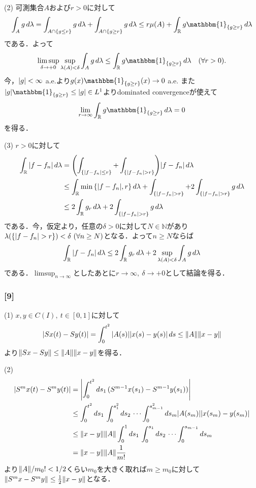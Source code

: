 \documentclass[a4j]{ltjsarticle}
\newcommand{\Rset}{\mathbb{R}}
\newcommand{\Nset}{\mathbb{N}}
\newcommand{\1}{\mathbbm{1}}
\numberwithin{equation}{section}
\theoremstyle{definition}
\begin{document}
(2) 可測集合$A$および$r>0$に対して
\begin{equation}
    \int_{A}g\,d\lambda =\int_{A\cap\qty{g\leq r}}g\,d\lambda+\int_{A\cap\qty{g\geq r}}g\,d\lambda\leq r\mu(A)+\int_{\Rset}g\1_{\qty{g\geq r}}\,d\lambda 
\end{equation}
である．よって
\begin{equation}
    \limsup_{\delta\to+0}\sup_{\lambda(A)<\delta}\int_{A}g\,d\lambda\leq \int_{\Rset}g\1_{\qty{g\geq r}}\,d\lambda\quad (\forall r>0).
\end{equation}
今，$\abs{g}<\infty$ a.e.より$g(x)\1_{\qty{g\geq r}}(x)\to 0$ a.e. また$\abs{g}\1_{\qty{g\geq r}}\leq \abs{g}\in L^1$よりdominated convergenceが使えて
\begin{equation}
    \lim_{r\to\infty}\int_{\Rset}g\1_{\qty{g\geq r}}\,d\lambda=0
\end{equation}
を得る．

(3) $r>0$に対して
\begin{align}
    \int_{\Rset}\abs{f-f_n}\,d\lambda&=\qty(\int_{\qty{\abs{f-f_n}\leq r}}+\int_{\qty{\abs{f-f_n}>r}})\abs{f-f_n}\,d\lambda\\
    &\leq \int_{\Rset}\min\qty{\abs{f-f_n}, r}\,d\lambda+\int_{\qty{\abs{f-f_n}>r}} +2\int_{\qty{\abs{f-f_n}>r}}g\,d\lambda\\
    &\leq 2\int_{\Rset}g_r\,d\lambda+2\int_{\qty{\abs{f-f_n}>r}}g\,d\lambda 
\end{align}
である．今，仮定より，任意の$\delta>0$に対して$N\in\Nset$があり$\lambda\qty(\qty{\abs{f-f_n}>r})<\delta\ (\forall n\geq N)$となる．よって$n\geq N$ならば
\begin{equation}
    \int_{\Rset}\abs{f-f_n}\,d\lambda\leq 2\int_{\Rset}g_r\,d\lambda+2\sup_{\lambda(A)<\delta}\int_{A}g\,d\lambda
\end{equation}
である．$\limsup_{n\to\infty}$としたあとに$r\to\infty,\ \delta\to+0$として結論を得る．

\subsubsection*{[9]}
(1) $x,y\in C(I),\ t\in[0,1]$に対して
\begin{equation}
    \abs{Sx(t)-Sy(t)}=\int_{0}^{t^2}\abs{A(s)}\abs{x(s)-y(s)}\,ds\leq \norm{A}\norm{x-y}
\end{equation}
より$\norm{Sx-Sy}\leq \norm{A}\norm{x-y}$を得る．

(2) 
\begin{align}
    \abs{S^mx(t)-S^my(t)}&=\abs{\int_{0}^{t^2}ds_1\,(S^{m-1}x(s_1)-S^{m-1}y(s_1))}\\
    &\leq \int_{0}^{t^2}ds_1\,\int_{0}^{s_1^2}ds_2\,\cdots\int_{0}^{s_{m-1}^2}ds_m \abs{A(s_m)}\abs{x(s_m)-y(s_m)}\\
    &\leq \norm{x-y}\norm{A}\int_{0}^{1}ds_1\,\int_{0}^{s_1}ds_2\,\cdots\int_{0}^{s_{m-1}}ds_m\\
    &=\norm{x-y}\norm{A}\frac{1}{m!}
\end{align}
より$\norm{A}/m_0!<1/2$くらい$m_0$を大きく取れば$m\geq m_0$に対して$\norm{S^mx-S^my}\leq \frac{1}{2}\norm{x-y}$となる．
\end{document}
